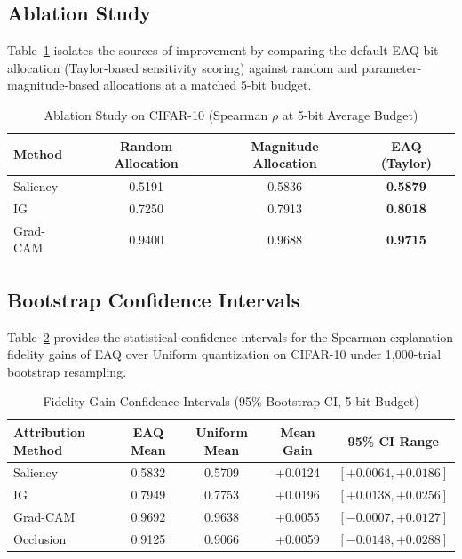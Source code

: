 \documentclass[11pt,a4paper]{article}
\begin{document}
\subsection{Ablation Study}
Table~\ref{tab:ablation} isolates the sources of improvement by comparing the default EAQ bit allocation (Taylor-based sensitivity scoring) against random and parameter-magnitude-based allocations at a matched 5-bit budget.

\begin{table}[h]
\caption{Ablation Study on CIFAR-10 (Spearman $\rho$ at 5-bit Average Budget)}
\label{tab:ablation}
\centering
\begin{tabular}{lccc}
\toprule
\textbf{Method} & \textbf{Random Allocation} & \textbf{Magnitude Allocation} & \textbf{EAQ (Taylor)} \\
\midrule
Saliency & 0.5191 & 0.5836 & \textbf{0.5879} \\
IG & 0.7250 & 0.7913 & \textbf{0.8018} \\
Grad-CAM & 0.9400 & 0.9688 & \textbf{0.9715} \\
\bottomrule
\end{tabular}
\end{table}

\subsection{Bootstrap Confidence Intervals}
Table~\ref{tab:boot} provides the statistical confidence intervals for the Spearman explanation fidelity gains of EAQ over Uniform quantization on CIFAR-10 under 1,000-trial bootstrap resampling.

\begin{table}[h]
\caption{Fidelity Gain Confidence Intervals (95\% Bootstrap CI, 5-bit Budget)}
\label{tab:boot}
\centering
\begin{tabular}{lcccc}
\toprule
\textbf{Attribution Method} & \textbf{EAQ Mean} & \textbf{Uniform Mean} & \textbf{Mean Gain} & \textbf{95\% CI Range} \\
\midrule
Saliency & 0.5832 & 0.5709 & +0.0124 & $[+0.0064, +0.0186]$ \\
IG & 0.7949 & 0.7753 & +0.0196 & $[+0.0138, +0.0256]$ \\
Grad-CAM & 0.9692 & 0.9638 & +0.0055 & $[-0.0007, +0.0127]$ \\
Occlusion & 0.9125 & 0.9066 & +0.0059 & $[-0.0148, +0.0288]$ \\
\bottomrule
\end{tabular}
\end{table}
\end{document}
